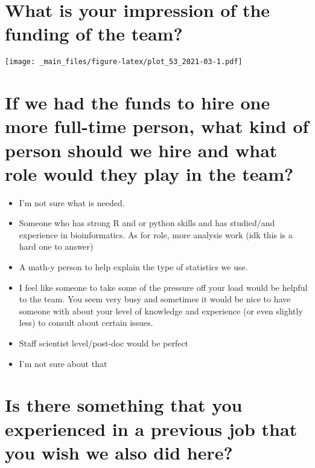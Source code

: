 \documentclass[
]{book}
\providecommand{\tightlist}{%
  \setlength{\itemsep}{0pt}\setlength{\parskip}{0pt}}
\begin{document}
\hypertarget{what-is-your-impression-of-the-funding-of-the-team-1}{%
\section{What is your impression of the funding of the team?}\label{what-is-your-impression-of-the-funding-of-the-team-1}}

\texttt{[image: \_main\_files/figure-latex/plot\_53\_2021-03-1.pdf]}

\hypertarget{if-we-had-the-funds-to-hire-one-more-full-time-person-what-kind-of-person-should-we-hire-and-what-role-would-they-play-in-the-team-1}{%
\section{If we had the funds to hire one more full-time person, what kind of person should we hire and what role would they play in the team?}\label{if-we-had-the-funds-to-hire-one-more-full-time-person-what-kind-of-person-should-we-hire-and-what-role-would-they-play-in-the-team-1}}

\begin{itemize}
\tightlist
\item
  I'm not sure what is needed.
\item
  Someone who has strong R and or python skills and has studied/and experience in bioinformatics. As for role, more analysis work (idk this is a hard one to answer)
\item
  A math-y person to help explain the type of statistics we use.
\item
  I feel like someone to take some of the pressure off your load would be helpful to the team. You seem very busy and sometimes it would be nice to have someone with about your level of knowledge and experience (or even slightly less) to consult about certain issues.
\item
  Staff scientist level/post-doc would be perfect
\item
  I'm not sure about that
\end{itemize}

\hypertarget{is-there-something-that-you-experienced-in-a-previous-job-that-you-wish-we-also-did-here-1}{%
\section{Is there something that you experienced in a previous job that you wish we also did here?}\label{is-there-something-that-you-experienced-in-a-previous-job-that-you-wish-we-also-did-here-1}}
\end{document}
